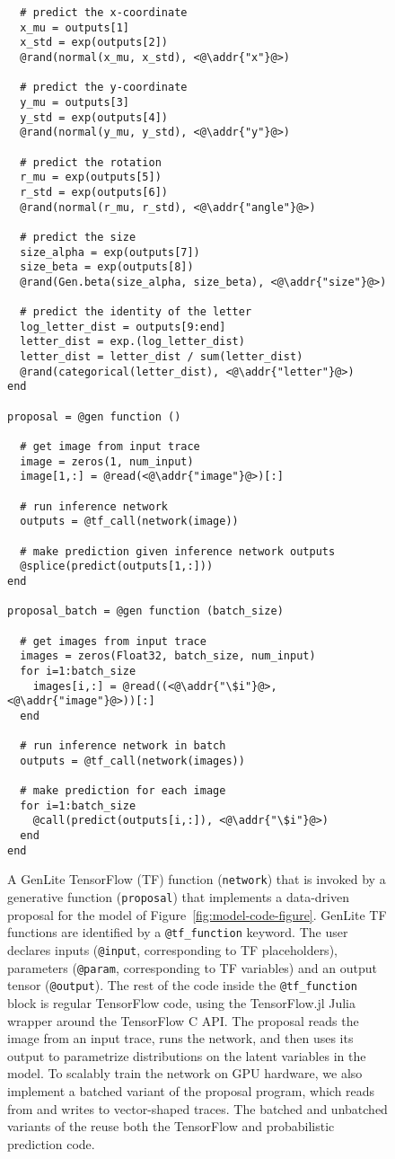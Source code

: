 \begin{figure}[t]
\begin{minipage}[t]{0.4\textwidth}
\begin{lstlisting}
  # predict the x-coordinate
  x_mu = outputs[1]
  x_std = exp(outputs[2])
  @rand(normal(x_mu, x_std), <@\addr{"x"}@>)

  # predict the y-coordinate
  y_mu = outputs[3]
  y_std = exp(outputs[4])
  @rand(normal(y_mu, y_std), <@\addr{"y"}@>)

  # predict the rotation
  r_mu = exp(outputs[5])
  r_std = exp(outputs[6])
  @rand(normal(r_mu, r_std), <@\addr{"angle"}@>)

  # predict the size 
  size_alpha = exp(outputs[7])
  size_beta = exp(outputs[8])
  @rand(Gen.beta(size_alpha, size_beta), <@\addr{"size"}@>)
  
  # predict the identity of the letter
  log_letter_dist = outputs[9:end]
  letter_dist = exp.(log_letter_dist)
  letter_dist = letter_dist / sum(letter_dist)
  @rand(categorical(letter_dist), <@\addr{"letter"}@>)
end

proposal = @gen function ()

  # get image from input trace
  image = zeros(1, num_input)
  image[1,:] = @read(<@\addr{"image"}@>)[:]

  # run inference network
  outputs = @tf_call(network(image))

  # make prediction given inference network outputs
  @splice(predict(outputs[1,:]))
end

proposal_batch = @gen function (batch_size)

  # get images from input trace
  images = zeros(Float32, batch_size, num_input)
  for i=1:batch_size
    images[i,:] = @read((<@\addr{"\$i"}@>, <@\addr{"image"}@>))[:]
  end

  # run inference network in batch
  outputs = @tf_call(network(images))
  
  # make prediction for each image
  for i=1:batch_size
    @call(predict(outputs[i,:]), <@\addr{"\$i"}@>)
  end
end
\end{lstlisting}
\end{minipage}
\caption{
A GenLite TensorFlow (TF) function (\texttt{network}) that is invoked by a generative function (\texttt{proposal}) that implements a data-driven proposal for the model of Figure~\ref{fig:model-code-figure}.
GenLite TF functions are identified by a \texttt{@tf\_function} keyword.
The user declares inputs (\texttt{@input}, corresponding to TF placeholders), parameters (\texttt{@param}, corresponding to TF variables) and an output tensor (\texttt{@output}).
The rest of the code inside the \texttt{@tf\_function} block is regular TensorFlow code, using the TensorFlow.jl Julia wrapper \cite{?} around the TensorFlow C API.
The proposal reads the image from an input trace, runs the network, and then uses its output to parametrize distributions on the latent variables in the model.
To scalably train the network on GPU hardware, we also implement a batched variant of the proposal program, which reads from and writes to vector-shaped traces.
The batched and unbatched variants of the reuse both the TensorFlow and probabilistic prediction code.
}
\label{fig:proposal-code-figure}
\end{figure}


